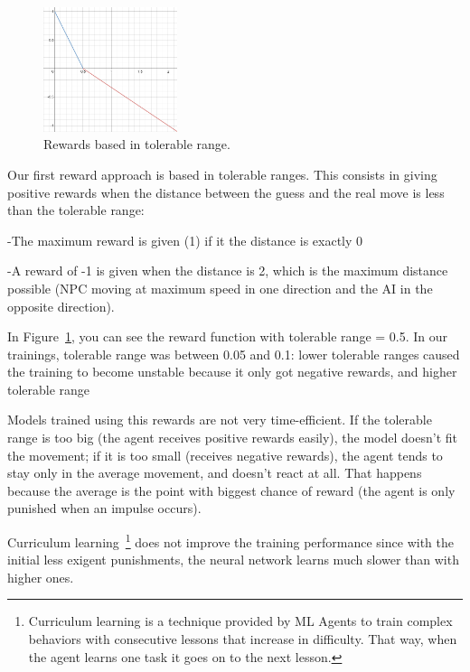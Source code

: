 \begin{figure}
    \centering
    \includegraphics[width=0.35\textwidth]{img/rewTR.png}
		\caption{Rewards based in tolerable range.}
		\label{fig:trange}
\end{figure}

Our first reward approach is based in tolerable ranges. This consists in giving positive rewards when the distance between the guess and the real move is less than the tolerable range:

-The maximum reward is given (1) if it the distance is exactly 0

-A reward of -1 is given when the distance is 2, which is the maximum distance possible (NPC moving at maximum speed in one direction and the AI in the opposite direction).

In Figure~\ref{fig:trange}, you can see the reward function with tolerable range = 0.5. In our trainings, tolerable range was between 0.05 and 0.1: lower tolerable ranges caused the training to become unstable because it only got negative rewards, and higher tolerable range

Models trained using this rewards are not very time-efficient. If the tolerable range is too big (the agent receives positive rewards easily), the model doesn't fit the movement; if it is too small (receives negative rewards), the agent tends to stay only in the average movement, and doesn't react at all. That happens because the average is the point with biggest chance of reward (the agent is only punished when an impulse occurs). 

Curriculum learning~\footnote{Curriculum learning is a technique provided by ML Agents to train complex behaviors with consecutive lessons that increase in difficulty. That way, when the agent learns one task it goes on to the next lesson.} does not improve the training performance since with the initial less exigent punishments, the neural network learns much slower than with higher ones.

